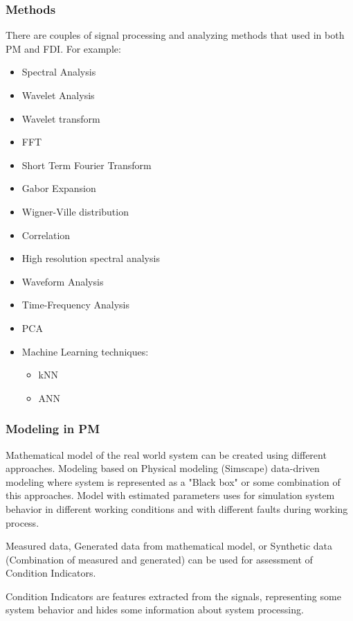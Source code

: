 \documentclass[class=article, crop=false]{standalone}
\begin{document}
\subsubsection{Methods}
There are couples of signal processing and analyzing methods that used in
both PM and FDI. For example:
\begin{itemize}
    \item Spectral Analysis
    \item Wavelet Analysis
    \item Wavelet transform
    \item FFT
    \item Short Term Fourier Transform
    \item Gabor Expansion
    \item Wigner-Ville distribution
    \item Correlation
    \item High resolution spectral analysis
    \item Waveform Analysis
    \item Time-Frequency Analysis
    \item PCA
    \item Machine Learning techniques:
        \begin{itemize}
            \item kNN
            \item ANN
        \end{itemize}
\end{itemize}

\subsubsection{Modeling in PM}

Mathematical model of the real world system can be created using different
approaches. Modeling based on Physical modeling (Simscape) data-driven
modeling where system is represented as a "Black box" or some combination
of this approaches.
Model with estimated parameters uses for simulation system behavior in
different working conditions and with different faults during working
process.

Measured data, Generated data from mathematical model, or Synthetic data
(Combination of measured and generated) can be used for assessment of
Condition Indicators. 

Condition Indicators are features extracted from the signals, representing some
system behavior and hides some information about system processing.
\end{document}
